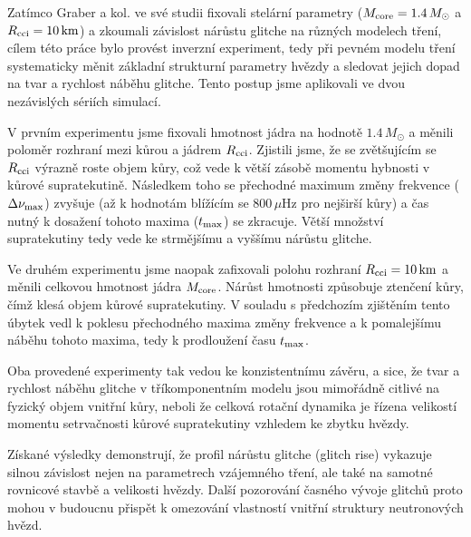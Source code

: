 \documentclass[%
final%
,htext%
]{ipothes}
\begin{document}
Zatímco Graber a kol. ve své studii fixovali stelární parametry ($M_{\rm core} = 1.4\,M_{\odot}$ a $R_{\rm cci} = 10\,\text{km}$) a zkoumali závislost nárůstu glitche na různých modelech tření, cílem této práce bylo provést inverzní experiment, tedy při pevném modelu tření systematicky měnit základní strukturní parametry hvězdy a sledovat jejich dopad na tvar a rychlost náběhu glitche. Tento postup jsme aplikovali ve dvou nezávislých sériích simulací.

V prvním experimentu jsme fixovali hmotnost jádra na hodnotě $1.4\,M_{\odot}$ a měnili poloměr rozhraní mezi kůrou a jádrem $R_{\rm cci}$. Zjistili jsme, že se zvětšujícím se $R_{\rm cci}$ výrazně roste objem kůry, což vede k větší zásobě momentu hybnosti v kůrové supratekutině. Následkem toho se přechodné maximum změny frekvence ($\Delta\nu_{\rm max}$) zvyšuje (až k hodnotám blížícím se $800\,\mu\text{Hz}$ pro nejširší kůry) a čas nutný k dosažení tohoto maxima ($t_{\rm max}$) se zkracuje. Větší množství supratekutiny tedy vede ke strmějšímu a vyššímu nárůstu glitche.

Ve druhém experimentu jsme naopak zafixovali polohu rozhraní $R_{\rm cci} = 10\,\text{km}$ a měnili celkovou hmotnost jádra $M_{\rm core}$. Nárůst hmotnosti způsobuje ztenčení kůry, čímž klesá objem kůrové supratekutiny. V souladu s předchozím zjištěním tento úbytek vedl k poklesu přechodného maxima změny frekvence a k pomalejšímu náběhu tohoto maxima, tedy k prodloužení času $t_{\rm max}$.

Oba provedené experimenty tak vedou ke konzistentnímu závěru, a sice, že tvar a rychlost náběhu glitche v tříkomponentním modelu jsou mimořádně citlivé na fyzický objem vnitřní kůry, neboli že celková rotační dynamika je řízena velikostí momentu setrvačnosti kůrové supratekutiny vzhledem ke zbytku hvězdy. 

Získané výsledky demonstrují, že profil nárůstu glitche (glitch rise) vykazuje silnou závislost nejen na parametrech vzájemného tření, ale také na samotné rovnicové stavbě a velikosti hvězdy. Další pozorování časného vývoje glitchů proto mohou v budoucnu přispět k omezování vlastností vnitřní struktury neutronových hvězd.





\end{document}
